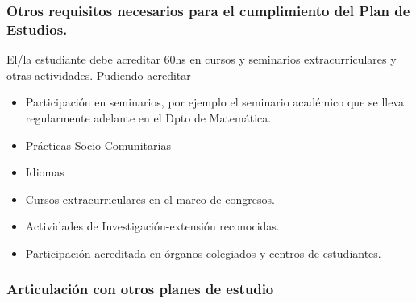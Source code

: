 \documentclass[a4paper, 12pt]{article}
\begin{document}
\subsubsection{Otros requisitos necesarios para el cumplimiento del Plan de Estudios.} 

El/la estudiante debe acreditar 60hs en cursos y seminarios extracurriculares y otras actividades. Pudiendo acreditar
\begin{itemize}
 \item Participación en seminarios, por ejemplo el seminario académico que se lleva regularmente adelante en el Dpto de Matemática.
 \item Prácticas Socio-Comunitarias 
 \item Idiomas
 \item Cursos extracurriculares en el marco de congresos.
 \item Actividades de Investigación-extensión reconocidas.
 \item Participación acreditada en órganos colegiados y centros de estudiantes.  
 \end{itemize}


\subsubsection{Articulación con otros planes de estudio}
\end{document}
